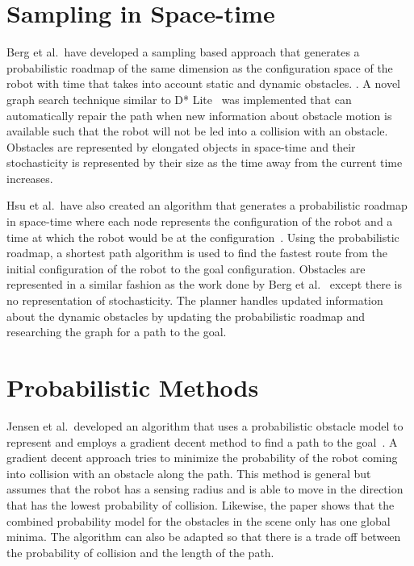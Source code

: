 \section{Sampling in Space-time}

Berg et al.\ have developed a sampling based approach that generates a
probabilistic roadmap of the same dimension as the configuration space of the
robot with time that takes into account static and dynamic obstacles.
\cite{van2006anytime}. A novel graph search technique similar to D*
Lite~\cite{koenig2002d} was implemented that can automatically repair the path
when new information about obstacle motion is available such that the robot
will not be led into a collision with an obstacle. Obstacles are represented by
elongated objects in space-time and their stochasticity is represented by their
size as the time away from the current time increases.

Hsu et al.\ have also created an algorithm that generates a probabilistic
roadmap in space-time where each node represents the configuration of the robot
and a time at which the robot would be at the
configuration~\cite{hsu2002randomized}. Using the probabilistic roadmap, a
shortest path algorithm is used to find the fastest route from the initial
configuration of the robot to the goal configuration. Obstacles are represented
in a similar fashion as the work done by Berg et al.~\cite{van2006anytime}
except there is no representation of stochasticity. The planner handles updated
information about the dynamic obstacles by updating the probabilistic roadmap
and researching the graph for a path to the goal.

\section{Probabilistic Methods}

Jensen et al.\ developed an algorithm that uses a probabilistic obstacle model
to represent and employs a gradient decent method to find a path to the
goal~\cite{jensen2003motion}. A gradient decent approach tries to minimize the
probability of the robot coming into collision with an obstacle along the path.
This method is general but assumes that the robot has a sensing radius and is
able to move in the direction that has the lowest probability of collision.
Likewise, the paper shows that the combined probability model for the obstacles
in the scene only has one global minima. The algorithm can also be adapted so
that there is a trade off between the probability of collision and the length
of the path.


